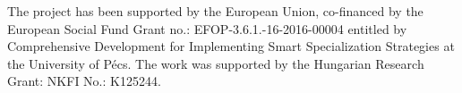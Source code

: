 \documentclass[manuscript=article, journal=jceda8]{achemso}
\begin{document}



\begin{acknowledgement}
The project has been supported by the European Union, co-financed by the European Social Fund Grant no.: EFOP-3.6.1.-16-2016-00004 entitled by Comprehensive Development for Implementing Smart Specialization Strategies at the University of Pécs. The work was supported by the Hungarian Research Grant: NKFI No.: K125244.
\end{acknowledgement}


\end{document}
